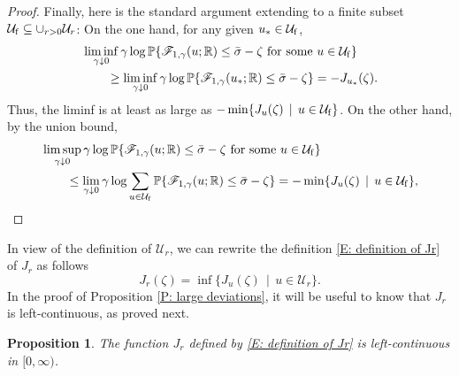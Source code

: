 \documentclass[12pt]{amsart}
\newtheorem{prop}{Proposition}
\begin{document}
\begin{proof}
        Finally, here is the standard argument extending to a finite subset $\mathcal{U}_{ \rm f } \subseteq \cup_{r > 0} \mathcal{U}_{r}$: On the one hand, for any given $u_{*} \in \mathcal{U}_{ \rm f }$,
            \begin{align*}
                &\liminf_{\gamma \downarrow 0} \gamma \log \mathbb{P} \{ \mathscr{F}_{1,\gamma} ( u ; \mathbb{R} ) \leq \bar{\sigma} - \zeta \, \, \text{for some} \, \, u \in \mathcal{U}_{ \rm f } \} \\
                &\qquad\geq \liminf_{\gamma \downarrow 0} \gamma \log \mathbb{P} \{ \mathscr{F}_{1,\gamma} ( u_{*} ; \mathbb{R} ) \leq \bar{\sigma} - \zeta \} = -J_{u_{*}}(\zeta).
            \end{align*}  
        Thus, the liminf is at least as large as $-\min\{J_{u}(\zeta) \, \mid \, u \in \mathcal{U}_{ \rm f }\}$.   On the other hand, by the union bound,
            \begin{align*}
                &\limsup_{\gamma \downarrow 0} \gamma \log \mathbb{P} \{ \mathscr{F}_{1,\gamma} ( u ; \mathbb{R} ) \leq \bar{\sigma} - \zeta \, \, \text{for some} \, \, u \in \mathcal{U}_{ \rm f }  \}\\
                &\qquad \leq \lim_{\gamma \downarrow 0} \gamma \log \sum_{u \in \mathcal{U}_{ \rm f }} \mathbb{P} \{ \mathscr{F}_{1,\gamma}(u;\mathbb{R}) \leq \bar{\sigma} - \zeta \} = -\min\{J_{u}(\zeta) \, \mid \, u \in \mathcal{U}_{ \rm f }\} ,
            \end{align*}
            \end{proof} 
        
In view of the definition of $\mathcal{U}_{r}$, we can rewrite the definition \eqref{E: definition of Jr} of $J_{r}$ as follows
\begin{equation*}
    J_{r}(\zeta) = \inf \{ J_{u}(\zeta) \, \mid \, u \in \mathcal{U}_{r} \} .
\end{equation*}
In the proof of Proposition \ref{P: large deviations}, it will be useful to know that $J_{r}$ is left-continuous, as proved next.
 
	\begin{prop} \label{P: left-continuity}
		The function $J_{r}$ defined by \eqref{E: definition of Jr} is left-continuous in $[0,\infty)$.
	 \end{prop}
	
\end{document}
